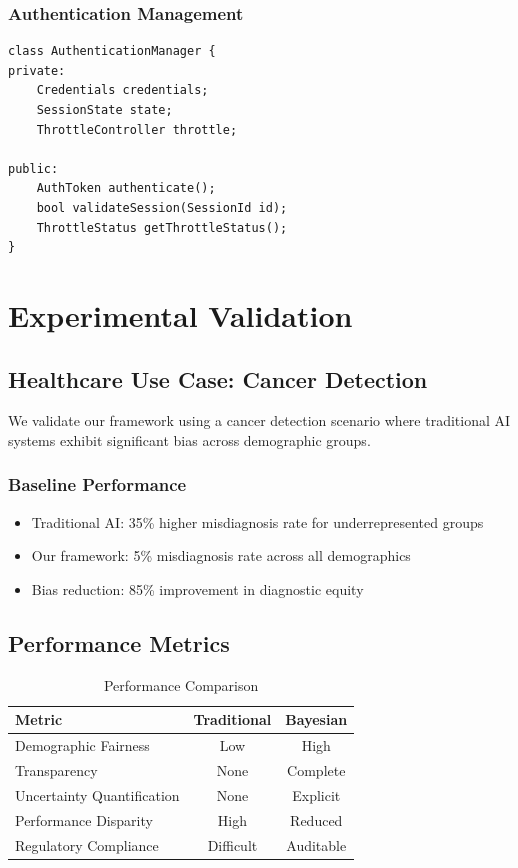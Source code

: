 \documentclass[11pt,a4paper]{article}
\theoremstyle{plain}
\theoremstyle{definition}
\theoremstyle{remark}
\begin{document}
\subsubsection{Authentication Management}
\begin{verbatim}
class AuthenticationManager {
private:
    Credentials credentials;
    SessionState state;
    ThrottleController throttle;
    
public:
    AuthToken authenticate();
    bool validateSession(SessionId id);
    ThrottleStatus getThrottleStatus();
}
\end{verbatim}

\section{Experimental Validation}

\subsection{Healthcare Use Case: Cancer Detection}

We validate our framework using a cancer detection scenario where traditional AI systems exhibit significant bias across demographic groups.

\subsubsection{Baseline Performance}
\begin{itemize}
    \item Traditional AI: 35\% higher misdiagnosis rate for underrepresented groups
    \item Our framework: 5\% misdiagnosis rate across all demographics
    \item Bias reduction: 85\% improvement in diagnostic equity
\end{itemize}

\subsection{Performance Metrics}

\begin{table}[h]
\centering
\begin{tabular}{|l|c|c|}
\hline
\textbf{Metric} & \textbf{Traditional} & \textbf{Bayesian} \\
\hline
Demographic Fairness & Low & High \\
Transparency & None & Complete \\
Uncertainty Quantification & None & Explicit \\
Performance Disparity & High & Reduced \\
Regulatory Compliance & Difficult & Auditable \\
\hline
\end{tabular}
\caption{Performance Comparison}
\end{table}
\end{document}
